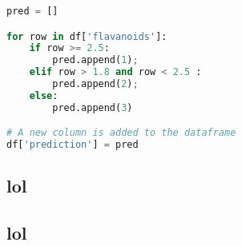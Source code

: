 \documentclass[11pt, french]{article}
\begin{document}
\begin{lstlisting}[language=Python]
pred = []

for row in df['flavanoids']:
	if row >= 2.5:
		pred.append(1);
	elif row > 1.8 and row < 2.5 :
		pred.append(2);    
	else:
		pred.append(3)

# A new column is added to the dataframe
df['prediction'] = pred
\end{lstlisting}	

\subsection*{lol}

\subsection*{lol}
\end{document}
